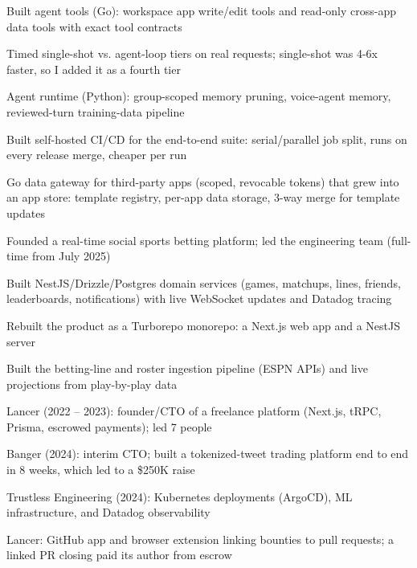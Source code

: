 \documentclass[print]{jack-resume}
\begin{document}
\begin{tightemize}
    \item Built agent tools (Go): workspace app write/edit tools and read-only cross-app data tools with exact tool contracts
    \item Timed single-shot vs. agent-loop tiers on real requests; single-shot was 4-6x faster, so I added it as a fourth tier
    \item Agent runtime (Python): group-scoped memory pruning, voice-agent memory, reviewed-turn training-data pipeline
    \item Built self-hosted CI/CD for the end-to-end suite: serial/parallel job split, runs on every release merge, cheaper per run
    \item Go data gateway for third-party apps (scoped, revocable tokens) that grew into an app store: template registry, per-app data storage, 3-way merge for template updates
\end{tightemize}
\sectionsep

\begin{tightemize}
    \item Founded a real-time social sports betting platform; led the engineering team (full-time from July 2025)
    \item Built NestJS/Drizzle/Postgres domain services (games, matchups, lines, friends, leaderboards, notifications) with live WebSocket updates and Datadog tracing
    \item Rebuilt the product as a Turborepo monorepo: a Next.js web app and a NestJS server
    \item Built the betting-line and roster ingestion pipeline (ESPN APIs) and live projections from play-by-play data
\end{tightemize}
\sectionsep

\begin{tightemize}
    \item Lancer (2022 -- 2023): founder/CTO of a freelance platform (Next.js, tRPC, Prisma, escrowed payments); led 7 people
    \item Banger (2024): interim CTO; built a tokenized-tweet trading platform end to end in 8 weeks, which led to a \$250K raise
    \item Trustless Engineering (2024): Kubernetes deployments (ArgoCD), ML infrastructure, and Datadog observability
    \item Lancer: GitHub app and browser extension linking bounties to pull requests; a linked PR closing paid its author from escrow
\end{tightemize}
\sectionsep
\end{document}
